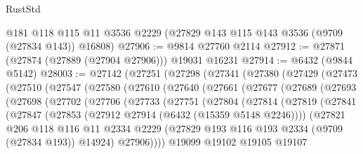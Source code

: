 \begin{lexlean}{RustStd}
\begin{coremodule}
    @181
    @118
    @115
    @11
    @3536
    @2229
    (@27829 @143 @115 @143 @3536 (@9709 (@27834 @143)) @16808)
@27906 := @9814 @27760 @2114
@27912 := @27871 (@27874 (@27889 (@27904 @27906))) @19031 @16231
@27914 := @6432 (@9844 @5142)
@28003 := @27142
    (@27251
      (@27298
        (@27341
          (@27380
            (@27429
              (@27473
                (@27510
                  (@27547
                    (@27580
                      (@27610
                        (@27640
                          (@27661
                            (@27677
                              (@27689
                                (@27693
                                  (@27698
                                    (@27702
                                      (@27706
                                        (@27733
                                          (@27751
                                            (@27804
                                              (@27814
                                                (@27819
                                                  (@27841
                                                    (@27847
                                                      (@27853
                                                        (@27912
                                                          @27914
                                                          (@6432 (@15359 @5148 @2246))))
                                                      (@27821
                                                        @206
                                                        @118
                                                        @116
                                                        @11
                                                        @2334
                                                        @2229
                                                        (@27829
                                                          @193
                                                          @116
                                                          @193
                                                          @2334
                                                          (@9709 (@27834 @193))
                                                          @14924)
                                                        @27906))))
                                                @19099
                                                @19102
                                                @19105
                                                @19107

\end{coremodule}
\end{lexlean}
